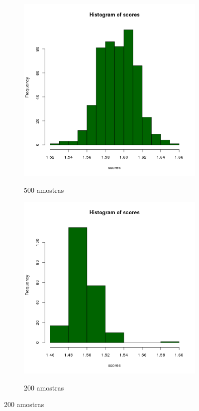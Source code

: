\documentclass[11pt,a4paper]{article}
\begin{document}
\begin{figure}
    \caption{Histogramas - Nexus 7, Android 4.4 Chrome}
    \label{nexus44histogramas}
    \begin{subfigure}{.5\textwidth}
        \caption{500 amostras}
        \centering
        \includegraphics[width=\textwidth]{images/hist-freq-n7-a44-chrome-500-amostras-20131119}
        \label{nexus44histograma500}
    \end{subfigure}
    \begin{subfigure}{.5\textwidth}
        \caption{200 amostras}
        \centering
        \includegraphics[width=\textwidth]{images/hist-freq-n7-a44-chrome-200-amostras-20131120}
        \label{nexus44histograma200}
    \end{subfigure}
\end{figure}
\end{document}
